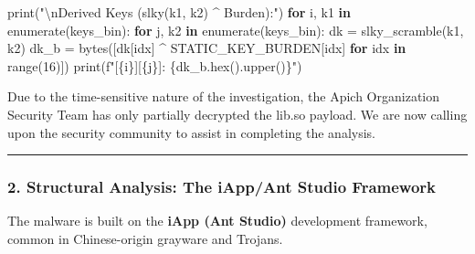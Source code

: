\documentclass[
]{article}
\newenvironment{Shaded}{}{}
\newcommand{\BuiltInTok}[1]{\textcolor[rgb]{0.00,0.50,0.00}{#1}}
\newcommand{\CharTok}[1]{\textcolor[rgb]{0.25,0.44,0.63}{#1}}
\newcommand{\ControlFlowTok}[1]{\textcolor[rgb]{0.00,0.44,0.13}{\textbf{#1}}}
\newcommand{\DecValTok}[1]{\textcolor[rgb]{0.25,0.63,0.44}{#1}}
\newcommand{\KeywordTok}[1]{\textcolor[rgb]{0.00,0.44,0.13}{\textbf{#1}}}
\newcommand{\NormalTok}[1]{#1}
\newcommand{\OperatorTok}[1]{\textcolor[rgb]{0.40,0.40,0.40}{#1}}
\newcommand{\SpecialCharTok}[1]{\textcolor[rgb]{0.25,0.44,0.63}{#1}}
\newcommand{\SpecialStringTok}[1]{\textcolor[rgb]{0.73,0.40,0.53}{#1}}
\newcommand{\StringTok}[1]{\textcolor[rgb]{0.25,0.44,0.63}{#1}}
\begin{document}
\begin{Shaded}
\begin{Highlighting}[]
\BuiltInTok{print}\NormalTok{(}\StringTok{"}\CharTok{\textbackslash{}n}\StringTok{Derived Keys (slky(k1, k2) \^{} Burden):"}\NormalTok{)}
\ControlFlowTok{for}\NormalTok{ i, k1 }\KeywordTok{in} \BuiltInTok{enumerate}\NormalTok{(keys\_bin):}
    \ControlFlowTok{for}\NormalTok{ j, k2 }\KeywordTok{in} \BuiltInTok{enumerate}\NormalTok{(keys\_bin):}
\NormalTok{        dk }\OperatorTok{=}\NormalTok{ slky\_scramble(k1, k2)}
\NormalTok{        dk\_b }\OperatorTok{=} \BuiltInTok{bytes}\NormalTok{([dk[idx] }\OperatorTok{\^{}}\NormalTok{ STATIC\_KEY\_BURDEN[idx] }\ControlFlowTok{for}\NormalTok{ idx }\KeywordTok{in} \BuiltInTok{range}\NormalTok{(}\DecValTok{16}\NormalTok{)])}
        \BuiltInTok{print}\NormalTok{(}\SpecialStringTok{f"[}\SpecialCharTok{\{}\NormalTok{i}\SpecialCharTok{\}}\SpecialStringTok{][}\SpecialCharTok{\{}\NormalTok{j}\SpecialCharTok{\}}\SpecialStringTok{]: }\SpecialCharTok{\{}\NormalTok{dk\_b}\SpecialCharTok{.}\BuiltInTok{hex}\NormalTok{()}\SpecialCharTok{.}\NormalTok{upper()}\SpecialCharTok{\}}\SpecialStringTok{"}\NormalTok{)}
\end{Highlighting}
\end{Shaded}

Due to the time-sensitive nature of the investigation, the Apich
Organization Security Team has only partially decrypted the lib.so
payload. We are now calling upon the security community to assist in
completing the analysis.

\begin{center}\rule{0.5\linewidth}{0.5pt}\end{center}

\subsubsection{2. Structural Analysis: The iApp/Ant Studio
Framework}\label{2-structural-analysis-the-iappant-studio-framework}

The malware is built on the \textbf{iApp (Ant Studio)} development
framework, common in Chinese-origin grayware and Trojans.
\end{document}

